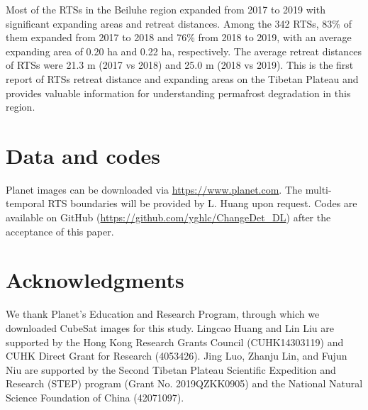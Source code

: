 \documentclass[authoryear,preprint,review,12pt]{elsarticle}
\begin{document}
Most of the RTSs in the Beiluhe region expanded from 2017 to 2019 with significant expanding areas and retreat distances. 
Among the 342 RTSs, 83\% of them expanded from 2017 to 2018 and 76\% from 2018 to 2019, with an average expanding area of 0.20 ha and 0.22 ha, respectively.
The average retreat distances of RTSs were 21.3 m (2017 vs 2018) and 25.0 m (2018 vs 2019).
This is the first report of RTSs retreat distance and expanding areas on the Tibetan Plateau and provides valuable information for understanding permafrost degradation in this region. 


\section{Data and codes}
\label{sec_data_codes}

Planet images can be downloaded via \url{https://www.planet.com}. 
The multi-temporal RTS boundaries will be provided by L. Huang upon request. 
Codes are available on GitHub (\url{https://github.com/yghlc/ChangeDet_DL}) after the acceptance of this paper.

\section{Acknowledgments}
\label{sec_acknowledgments}


We thank Planet's Education and Research Program, through which we downloaded CubeSat images for this study. 
Lingcao Huang and Lin Liu are supported by the Hong Kong Research Grants Council (CUHK14303119) and CUHK Direct Grant for Research (4053426).
Jing Luo, Zhanju Lin, and Fujun Niu are supported by the Second Tibetan Plateau Scientific Expedition and Research (STEP) program (Grant No. 2019QZKK0905) and the National Natural Science Foundation of China (42071097).



\end{document}
